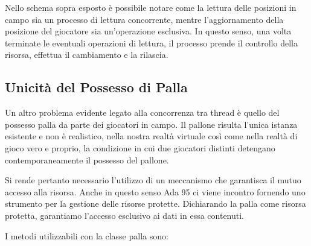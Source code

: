 \documentclass[aps,letterpaper,10pt]{article}
\begin{document}
Nello schema sopra esposto \`e possibile notare come la lettura delle posizioni in campo sia un processo di lettura concorrente, mentre l'aggiornamento della posizione del giocatore sia un'operazione esclusiva. In questo senso, una volta terminate le eventuali operazioni di lettura, il processo prende il controllo della risorsa, effettua il cambiamento e la rilascia. \vspace{3mm}

\subsection{Unicit\`a del Possesso di Palla}
\label{possessopalla}

Un altro problema evidente legato alla concorrenza tra thread \`e quello del possesso palla da parte dei giocatori in campo. Il pallone risulta l'unica istanza esistente e non \`e realistico, nella nostra realt\`a virtuale cos\`i come nella realt\`a di gioco vero e proprio, la condizione in cui due giocatori distinti detengano contemporaneamente il possesso del pallone. \vspace{3mm}

Si rende pertanto necessario l'utilizzo di un meccanismo che garantisca il mutuo accesso alla risorsa. Anche in questo senso Ada 95 ci viene incontro fornendo uno strumento per la gestione delle risorse protette. Dichiarando la palla come risorsa protetta, garantiamo l'accesso esclusivo ai dati in essa contenuti. \vspace{3mm}

I metodi utilizzabili con la classe palla sono:
\end{document}
